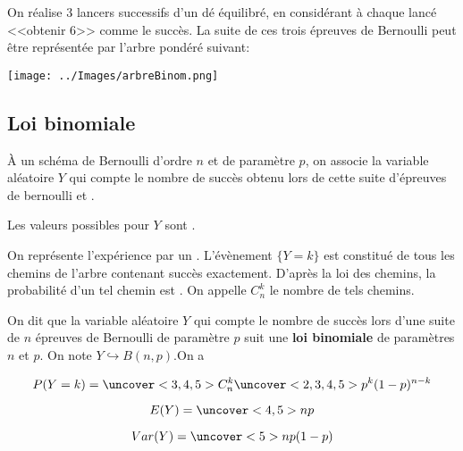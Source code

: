 \documentclass{beamer}
\begin{document}
 \begin{frame}
   \begin{example}
 On réalise $3$ lancers successifs d'un dé équilibré, en considérant à chaque lancé <<obtenir 6>>
 comme le succès. La suite de ces trois épreuves de Bernoulli peut être représentée par l'arbre pondéré
 suivant:
 
  \texttt{[image: ../Images/arbreBinom.png]}
 
  
 \end{example}
 \end{frame}

 \subsection{Loi binomiale}

 \begin{frame}
  
  \begin{definition}
  \`A un schéma de Bernoulli d'ordre $n$ et de paramètre $p$, on associe la variable aléatoire $Y$
  qui compte le nombre de succès obtenu lors de cette suite d'épreuves de bernoulli 
   et . 
  
  Les valeurs possibles pour $Y$ sont .
 \end{definition}
  On représente l'expérience par un . L'évènement $\lbrace Y=k \rbrace$ est constitué 
  de tous les chemins de l'arbre contenant  succès exactement. D'après la loi des chemins, la probabilité
  d'un tel chemin est . On appelle $C_n^k$ le nombre de tels chemins.

 \end{frame}

 \begin{frame}
  \begin{theorem}
   On dit que la variable aléatoire $Y$ qui compte le nombre de succès lors d'une suite de $n$ épreuves
   de Bernoulli de paramètre $p$ suit une \textbf{loi binomiale} de paramètres $n$ et $p$. On note 
   $Y \hookrightarrow B(n,p)$.On a 
   
   $$P(Y=k)=\uncover<3,4,5>{C_n^k} \uncover<2,3,4,5>{p^k (1-p)^{n-k}}$$
   
   $$E(Y)=\uncover<4,5>{np}$$
   
   $$Var(Y)=\uncover<5>{np(1-p)}$$
   
  \end{theorem}
\end{frame}
\end{document}
